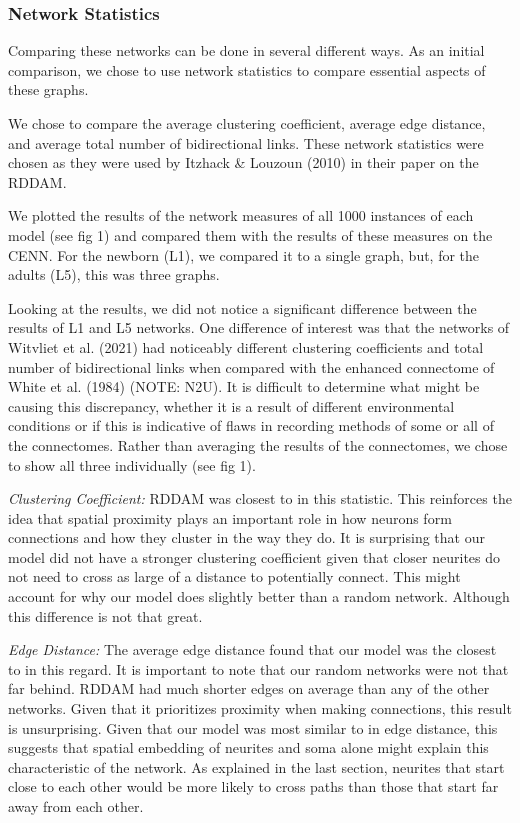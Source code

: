 \subsubsection{Network Statistics}
Comparing these networks can be done in several different ways. As an initial comparison, we chose to use network statistics to compare essential aspects of these graphs. 

We chose to compare the average clustering coefficient, average edge distance, and average total number of bidirectional links. These network statistics were chosen as they were used by Itzhack \& Louzoun (2010) in their paper on the RDDAM. 

We plotted the results of the network measures of all 1000 instances of each model (see fig 1) and compared them with the results of these measures on the CENN. For the newborn (L1), we compared it to a single graph, but, for the adults (L5), this was three graphs.


Looking at the results, we did not notice a significant difference between the results of L1 and L5 networks. One difference of interest was that the networks of Witvliet et al. (2021) had noticeably different clustering coefficients and total number of bidirectional links when compared with the enhanced connectome of White et al. (1984) (NOTE: N2U). It is difficult to determine what might be causing this discrepancy, whether it is a result of different environmental conditions or if this is indicative of flaws in recording methods of some or all of the connectomes. Rather than averaging the results of the connectomes, we chose to show all three individually (see fig 1). 

\textit{Clustering Coefficient:} RDDAM was closest to \ce in this statistic. This reinforces the idea that spatial proximity plays an important role in how neurons form connections and how they cluster in the way they do. It is surprising that our model did not have a stronger clustering coefficient given that closer neurites do not need to cross as large of a distance to potentially connect. This might account for why our model does slightly better than a random network. Although this difference is not that great.

\textit{Edge Distance:} The average edge distance found that our model was the closest to \ce in this regard. It is important to note that our random networks were not that far behind. RDDAM had much shorter edges on average than any of the other networks. Given that it prioritizes proximity when making connections, this result is unsurprising. Given that our model was most similar to \ce in edge distance, this suggests that spatial embedding of neurites and soma alone might explain this characteristic of the network. As explained in the last section, neurites that start close to each other would be more likely to cross paths than those that start far away from each other.

